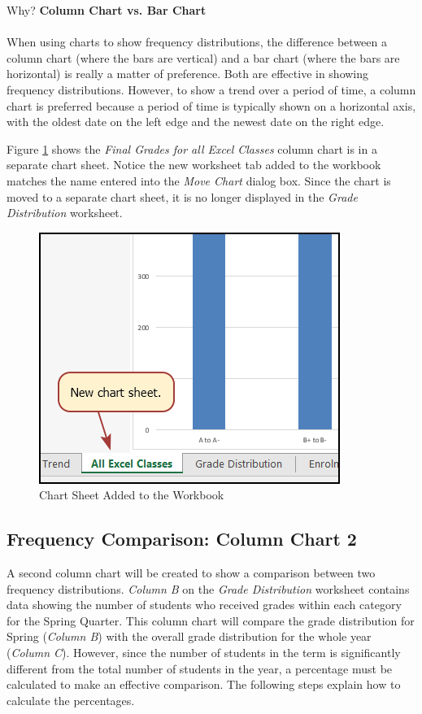 \begin{center}
	\begin{infobox}{Why?}
		\textbf{Column Chart vs. Bar Chart}
		\\
		\\
		When using charts to show frequency distributions, the difference between a column chart (where the bars are vertical) and a bar chart (where the bars are horizontal) is really a matter of preference. Both are effective in showing frequency distributions. However, to show a trend over a period of time, a column chart is preferred because a period of time is typically shown on a horizontal axis, with the oldest date on the left edge and the newest date on the right edge.
	\end{infobox}
\end{center}

Figure \ref{04:fig16} shows the \textit{Final Grades for all Excel Classes} column chart is in a separate chart sheet. Notice the new worksheet tab added to the workbook matches the name entered into the \textit{Move Chart} dialog box. Since the chart is moved to a separate chart sheet, it is no longer displayed in the \textit{Grade Distribution} worksheet.

\begin{figure}[H]
	\centering
	\includegraphics[width=\maxwidth{.65\linewidth}]{gfx/ch04_fig16}
	\caption{Chart Sheet Added to the Workbook}
	\label{04:fig16}
\end{figure}

\subsection{Frequency Comparison: Column Chart 2}

A second column chart will be created to show a comparison between two frequency distributions. \textit{Column B} on the \textit{Grade Distribution} worksheet contains data showing the number of students who received grades within each category for the Spring Quarter. This column chart will compare the grade distribution for Spring (\textit{Column B}) with the overall grade distribution for the whole year (\textit{Column C}). However, since the number of students in the term is significantly different from the total number of students in the year, a percentage must be calculated to make an effective comparison. The following steps explain how to calculate the percentages.

